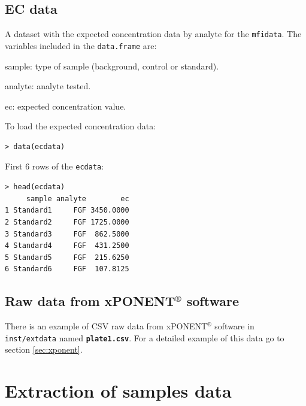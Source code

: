 \documentclass[11pt]{article}\usepackage[]{graphicx}\usepackage[]{color}
\makeatletter
\newenvironment{kframe}{%
 \def\at@end@of@kframe{}%
 \ifinner\ifhmode%
  \def\at@end@of@kframe{\end{minipage}}%
  \begin{minipage}{\columnwidth}%
 \fi\fi%
 \def\FrameCommand##1{\hskip\@totalleftmargin \hskip-\fboxsep
 \colorbox{shadecolor}{##1}\hskip-\fboxsep
     \hskip-\linewidth \hskip-\@totalleftmargin \hskip\columnwidth}%
 \MakeFramed {\advance\hsize-\width
   \@totalleftmargin\z@ \linewidth\hsize
   \@setminipage}}%
 {\par\unskip\endMakeFramed%
 \at@end@of@kframe}
\newenvironment{knitrout}{}{} %
\newenvironment{itemize*}%
    {\begin{itemize}%
        \setlength{\itemsep}{-0.35cm}%
        \setlength{\parskip}{10pt}}%
{\end{itemize}}
\makeatother
\begin{document}
\subsection{EC data}
A dataset with the expected concentration data by analyte for the 
{\tt mfidata}. The variables included in the {\tt data.frame} are:

\begin{itemize*}
    \item sample: type of sample (background, control or standard).
    \item analyte: analyte tested.
    \item ec: expected concentration value.
\end{itemize*}

\noindent To load the expected concentration data:
\begin{knitrout}
\color{fgcolor}\begin{kframe}
\begin{verbatim}
> data(ecdata)
\end{verbatim}
\end{kframe}
\end{knitrout}

\noindent First 6 rows of the {\tt ecdata}:
\begin{knitrout}
\color{fgcolor}\begin{kframe}
\begin{verbatim}
> head(ecdata)
     sample analyte        ec
1 Standard1     FGF 3450.0000
2 Standard2     FGF 1725.0000
3 Standard3     FGF  862.5000
4 Standard4     FGF  431.2500
5 Standard5     FGF  215.6250
6 Standard6     FGF  107.8125
\end{verbatim}
\end{kframe}
\end{knitrout}


\subsection{Raw data from xPONENT$^\circledR$ software}
There is an example of CSV raw data from xPONENT$^\circledR$ software in 
{\tt inst/extdata} named \textbf{{\tt plate1.csv}}. For a detailed example
of this data go to section \ref{sec:xponent}.



\section{Extraction of samples data} \label{Extraction of data}
\end{document}
